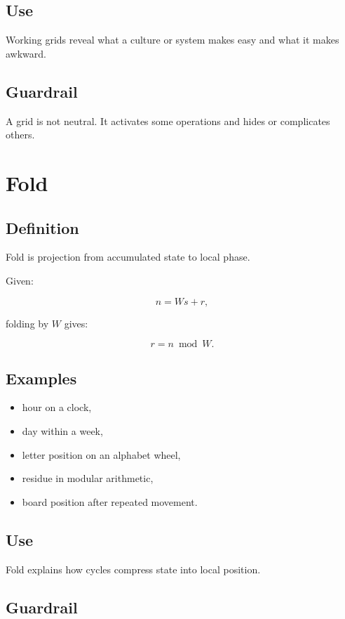 \documentclass[11pt]{book}
\begin{document}
\subsection*{Use}

Working grids reveal what a culture or system makes easy and what it makes awkward.

\subsection*{Guardrail}

A grid is not neutral. It activates some operations and hides or complicates others.

\section{Fold}

\subsection*{Definition}

Fold is projection from accumulated state to local phase.

Given:

\[
n = Ws + r,
\]

folding by \(W\) gives:

\[
r = n \bmod W.
\]

\subsection*{Examples}

\begin{itemize}
    \item hour on a clock,
    \item day within a week,
    \item letter position on an alphabet wheel,
    \item residue in modular arithmetic,
    \item board position after repeated movement.
\end{itemize}

\subsection*{Use}

Fold explains how cycles compress state into local position.

\subsection*{Guardrail}
\end{document}
